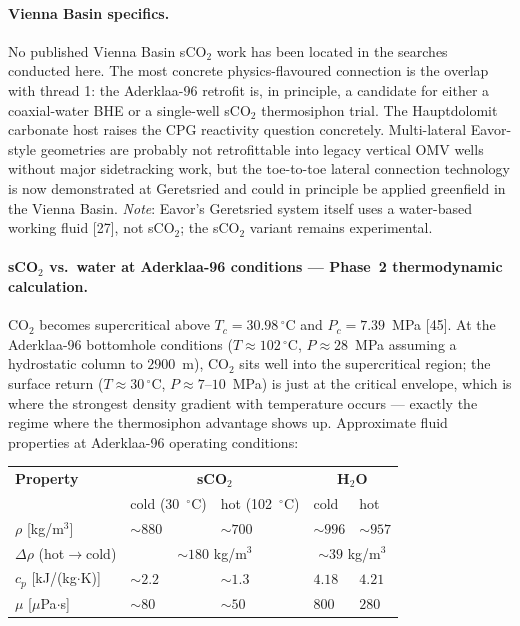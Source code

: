 \documentclass{article}
\begin{document}
\paragraph{Vienna Basin specifics.}
No published Vienna Basin sCO$_2$ work has been located in the searches
conducted here. The most concrete physics-flavoured connection is the
overlap with thread 1: the Aderklaa-96 retrofit is, in principle, a
candidate for either a coaxial-water BHE or a single-well sCO$_2$
thermosiphon trial. The Hauptdolomit carbonate host raises the CPG
reactivity question concretely. Multi-lateral Eavor-style geometries are
probably not retrofittable into legacy vertical OMV wells without major
sidetracking work, but the toe-to-toe lateral connection technology is
now demonstrated at Geretsried and could in principle be applied
greenfield in the Vienna Basin. \emph{Note}: Eavor's Geretsried system
itself uses a water-based working fluid [27], not sCO$_2$; the sCO$_2$
variant remains experimental.

\paragraph{sCO$_2$ vs.\ water at Aderklaa-96 conditions ---
Phase~2 thermodynamic calculation.} CO$_2$ becomes supercritical above
$T_c = 30.98\,^\circ$C and $P_c = 7.39$~MPa [45]. At the Aderklaa-96
bottomhole conditions ($T\approx 102\,^\circ$C, $P\approx 28$~MPa
assuming a hydrostatic column to $2900$~m), CO$_2$ sits well into the
supercritical region; the surface return ($T\approx 30\,^\circ$C,
$P\approx 7$--$10$~MPa) is just at the critical envelope, which is
where the strongest density gradient with temperature occurs ---
exactly the regime where the thermosiphon advantage shows up. Approximate
fluid properties at Aderklaa-96 operating conditions:

\begin{center}
\begin{tabular}{lllll}
\hline
\textbf{Property} & \multicolumn{2}{c}{\textbf{sCO$_2$}} & \multicolumn{2}{c}{\textbf{H$_2$O}} \\
                  & cold (30~$^\circ$C)& hot (102~$^\circ$C)& cold & hot \\
\hline
$\rho$ [kg/m$^3$]              & $\sim 880$ & $\sim 700$ & $\sim 996$ & $\sim 957$ \\
$\Delta\rho$ (hot$\to$cold)    & \multicolumn{2}{c}{$\sim 180$ kg/m$^3$} & \multicolumn{2}{c}{$\sim 39$ kg/m$^3$} \\
$c_p$ [kJ/(kg$\cdot$K)]        & $\sim 2.2$ & $\sim 1.3$ & $4.18$     & $4.21$ \\
$\mu$ [$\mu$Pa$\cdot$s]        & $\sim 80$  & $\sim 50$  & $800$      & $280$ \\
\hline
\end{tabular}
\end{center}
\end{document}
